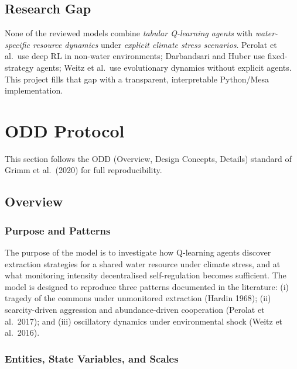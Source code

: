 \documentclass[12pt, a4paper]{article}
\begin{document}
\subsection{Research Gap}

None of the reviewed models combine \emph{tabular Q-learning agents} with
\emph{water-specific resource dynamics} under \emph{explicit climate stress
scenarios}. Perolat et al.\ use deep RL in non-water environments;
Darbandsari and Huber use fixed-strategy agents; Weitz et al.\ use evolutionary
dynamics without explicit agents. This project fills that gap with a
transparent, interpretable Python/Mesa implementation.

\section{ODD Protocol}

This section follows the ODD (Overview, Design Concepts, Details) standard of
Grimm et al.\ (2020) for full reproducibility.

\subsection{Overview}

\subsubsection{Purpose and Patterns}

The purpose of the model is to investigate how Q-learning agents discover
extraction strategies for a shared water resource under climate stress, and at
what monitoring intensity decentralised self-regulation becomes sufficient. The
model is designed to reproduce three patterns documented in the literature:
(i) tragedy of the commons under unmonitored extraction (Hardin 1968);
(ii) scarcity-driven aggression and abundance-driven cooperation (Perolat et al.\
2017); and (iii) oscillatory dynamics under environmental shock (Weitz et al.\
2016).

\subsubsection{Entities, State Variables, and Scales}
\end{document}
